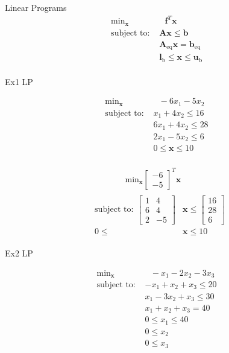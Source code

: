 \documentclass{article}
\begin{document}
Linear Programs
\begin{align*}
    \text{min}_{\mathbf{x}}& \text{ } \mathbf{f}^T \mathbf{x} \\
    \mbox{subject to: }& \mathbf{A}\mathbf{x} \le \mathbf{b}\\
                       & \mathbf{A}_{\text{eq}}\mathbf{x} =  \mathbf{b}_{\text{eq}}\\
                       & \mathbf{l}_{\text{b}} \le \mathbf{x} \le \mathbf{u}_{\text{b}}\\
\end{align*}

Ex1 LP

\begin{align*}
    \text{min}_{\mathbf{x}}& \text{ } -6x_1 - 5x_2 \\
    \mbox{subject to: } & x_1 + 4x_2 \le 16\\
                        & 6x_1 + 4x_2 \le 28\\
                        & 2x_1 - 5x_2 \le 6\\
                       & 0 \le \mathbf{x} \le 10\\
\end{align*}

\begin{align*}
    &\qquad \qquad \text{min}_{\mathbf{x}}  \begin{bmatrix} -6 \\ -5 \end{bmatrix}^T \mathbf{x} \\
    &\begin{aligned}
    \mbox{subject to: } \begin{bmatrix} 1 & 4 \\ 6 & 4 \\ 2 & -5 \end{bmatrix} &\mathbf{x} \le \begin{bmatrix} 16 \\ 28 \\ 6 \end{bmatrix} \\
                        0 \le &\mathbf{x} \le 10
    \end{aligned}
\end{align*}

Ex2 LP

\begin{align*}
    \text{min}_{\mathbf{x}}& \text{ } -x_1 - 2x_2 - 3x_3 \\
    \mbox{subject to: } & -x_1 + x_2 + x_3 \le 20\\
                        & x_1 - 3x_2 + x_3 \le 30\\
                        & x_1 + x_2 + x_3 = 40\\
                       & 0 \le x_1 \le 40\\
                       & 0 \le x_2 \\
                       & 0 \le x_3 \\
\end{align*}
\end{document}
